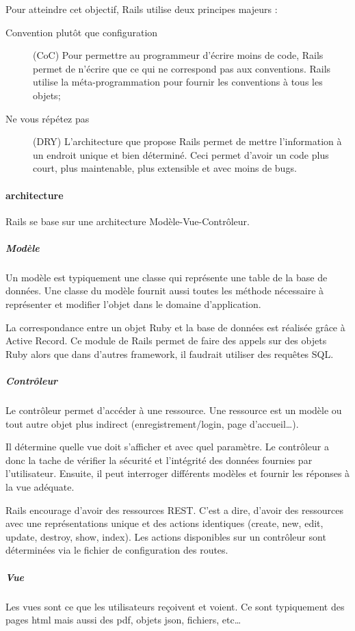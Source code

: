 Pour atteindre cet objectif, Rails utilise deux principes majeurs :
\begin{description}
  \item[Convention plutôt que configuration] (CoC) Pour permettre au programmeur d'écrire moins de code, Rails permet de n'écrire que ce qui ne correspond pas aux conventions. Rails utilise la méta-programmation pour fournir les conventions à tous les objets;
  \item[Ne vous répétez  pas] (DRY) L'architecture que propose Rails permet de mettre l'information à un endroit unique et bien déterminé. Ceci permet d'avoir un code plus court, plus maintenable, plus extensible et avec moins de bugs.
\end{description}

\paragraph{architecture}
Rails se base sur une architecture Modèle-Vue-Contrôleur.
\subparagraph{Modèle} 
Un modèle est typiquement une classe qui représente une table de la base de données. Une classe du modèle fournit aussi toutes les méthode nécessaire à représenter et modifier l'objet dans le domaine d'application.

La correspondance entre un objet Ruby et la base de données est réalisée grâce à Active Record. Ce module de Rails permet de faire des appels sur des objets Ruby alors que dans d'autres framework, il faudrait utiliser des requêtes SQL.
  
\subparagraph{Contrôleur} 
Le contrôleur permet d'accéder à une ressource. Une ressource est un modèle ou tout autre objet plus indirect (enregistrement/login, page d'accueil\ldots).  

Il détermine quelle vue doit s'afficher et avec quel paramètre. Le contrôleur a donc la tache de vérifier la sécurité et l'intégrité des données fournies par l'utilisateur. Ensuite, il peut interroger différents modèles et fournir les réponses à la vue adéquate. 

Rails encourage d'avoir des ressources REST. C'est a dire, d'avoir des ressources avec une représentations unique et des actions identiques (create, new, edit, update, destroy, show, index). Les actions disponibles sur un contrôleur sont déterminées via le fichier de configuration des routes.

\subparagraph{Vue} 
Les vues sont ce que les utilisateurs reçoivent et voient. Ce sont typiquement des pages html mais aussi des pdf, objets json, fichiers, etc\ldots 

